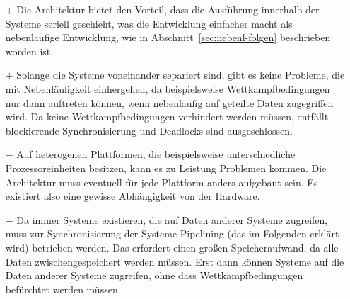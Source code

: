 \begin{itemize}
	\item[$+$] Die Architektur bietet den Vorteil, dass die Ausführung innerhalb der Systeme seriell geschieht, was die Entwicklung einfacher macht als nebenläufige Entwicklung, wie in Abschnitt~\ref{sec:nebenl-folgen}  beschrieben worden ist.
	\item[$+$] Solange die Systeme voneinander separiert sind, gibt es keine Probleme, die mit Nebenläufigkeit einhergehen, da beispielsweise Wettkampfbedingungen nur dann auftreten können, wenn nebenläufig auf geteilte Daten zugegriffen wird. Da keine Wettkampfbedingungen verhindert werden müssen, entfällt blockierende Synchronisierung und Deadlocks sind ausgeschlossen.
	\item[$-$] Auf heterogenen Plattformen, die beispielsweise unterschiedliche Prozessoreinheiten besitzen, kann es zu Leistung Problemen kommen. Die Architektur muss eventuell für jede Plattform anders aufgebaut sein. Es existiert also eine gewisse Abhängigkeit von der Hardware.
	\item[$-$] Da immer Systeme existieren, die auf Daten anderer Systeme zugreifen, muss zur Synchronisierung der Systeme Pipelining (das im Folgenden erklärt wird) betrieben werden. Das erfordert einen großen Speicheraufwand, da alle Daten zwischengespeichert werden müssen. Erst dann können Systeme auf die Daten anderer Systeme zugreifen, ohne dass Wettkampfbedingungen befürchtet werden müssen.
\end{itemize}

